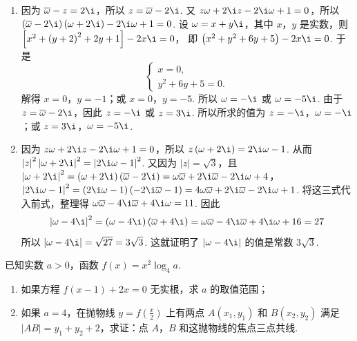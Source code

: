 \begin{solution}
\begin{enumerate}
\item 因为 \(\overline{\omega}-z=2\i\)，所以 \(z=\overline{\omega}-2\i\). 又 \(z\omega+2\i z-2\i\omega+1=0\)，所以
\(\left( \overline{\omega}-2\i \right)\left( \omega+2\i \right)-2\i\omega+1=0\).
设 \(\omega=x+y\i\)，其中 \(x\)，\(y\) 是实数，则
\(\left[ x^2+\left( y+2 \right)^2+2y+1 \right]-2x\i=0\)，
即
\(\left( x^2+y^2+6y+5 \right)-2x\i=0\).
于是
\[
\begin{cases}
x=0,\\
y^2+6y+5=0.
\end{cases}
\]
解得 \(x=0\)，\(y=-1\)；或 \(x=0\)，\(y=-5\). 所以 \(\omega=-\i\) 或 \(\omega=-5\i\). 由于 \(z=\overline{\omega}-2\i\)，因此 \(z=-\i\) 或 \(z=3\i\). 所以所求的值为 \(z=-\i\)，\(\omega=-\i\)；或 \(z=3\i\)，\(\omega=-5\i\).

\item 因为 \(z\omega+2\i z-2\i\omega+1=0\)，所以
\(z\left( \omega+2\i \right)=2\i\omega-1\).
从而
\(\left| z \right|^2\left| \omega+2\i \right|^2=\left| 2\i\omega-1 \right|^2\).
又因为 \(\left| z \right|=\sqrt{3}\)，且
\(\left| \omega+2\i \right|^2=\left( \omega+2\i \right)\left( \overline{\omega}-2\i \right)=\omega\overline{\omega}+2\i\overline{\omega}-2\i\omega+4\)，
\(\left| 2\i\omega-1 \right|^2=\left( 2\i\omega-1 \right)\left( -2\i\overline{\omega}-1 \right)=4\omega\overline{\omega}+2\i\overline{\omega}-2\i\omega+1\).
将这三式代入前式，整理得
\(\omega\overline{\omega}-4\i\overline{\omega}+4\i\omega=11\).
因此
\[
\left| \omega-4\i \right|^2=\left( \omega-4\i \right)\left( \overline{\omega}+4\i \right)=\omega\overline{\omega}-4\i\overline{\omega}+4\i\omega+16=27
\]
所以
\(\left| \omega-4\i \right|=\sqrt{27}=3\sqrt{3}\).
这就证明了 \(\left| \omega-4\i \right|\) 的值是常数 \(3\sqrt{3}\).
\end{enumerate}
\end{solution}

\begin{problem}
已知实数 \(a>0\)，函数 \(f(x)=x^2\log_4 a\).

\begin{enumerate}
\item 如果方程 \(f(x-1)+2x=0\) 无实根，求 \(a\) 的取值范围；
\item 如果 \(a=4\)，在抛物线 \(y=f\left( \frac{x}{2} \right)\) 上有两点 \(A(x_1,y_1)\) 和 \(B(x_2,y_2)\) 满足 \(\left| AB \right|=y_1+y_2+2\)，求证：点 \(A\)，\(B\) 和这抛物线的焦点三点共线.
\end{enumerate}
\end{problem}

